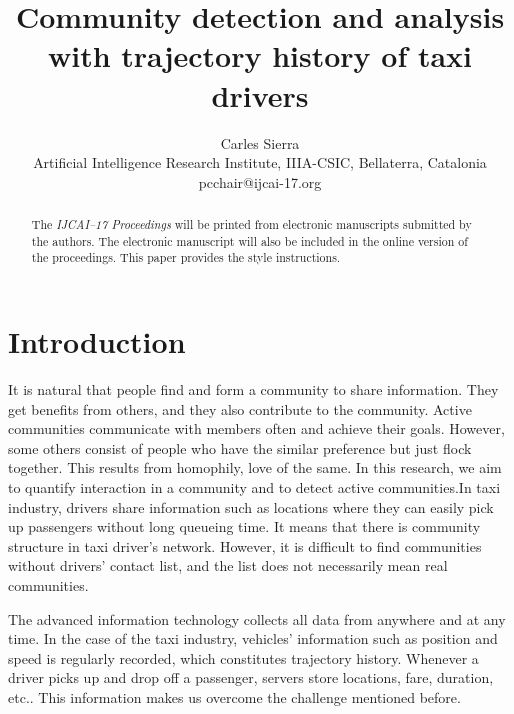 \documentclass{article}
\title{Community detection and analysis with trajectory history of taxi drivers}
\author{Carles Sierra\\ 
Artificial Intelligence Research Institute, IIIA-CSIC, Bellaterra, Catalonia  \\
pcchair@ijcai-17.org}
\begin{document}
\maketitle

\begin{abstract}
  The {\it IJCAI--17 Proceedings} will be printed from electronic
  manuscripts submitted by the authors. The electronic manuscript will
  also be included in the online version of the proceedings. This paper
  provides the style instructions.
\end{abstract}

\section{Introduction} \label{sec:introduction}

It is natural that people find and form a community to share information. They get benefits from others, and they also contribute to the community. Active communities communicate with members often and achieve their goals. However, some others consist of people who have the similar preference but just flock together. This results from homophily, love of the same. In this research, we aim to quantify interaction in a community and to detect active communities.In taxi industry, drivers share information such as locations where they can easily pick up passengers without long queueing time. It means that there is community structure in taxi driver's network. However, it is difficult to find communities without drivers' contact list, and the list does not necessarily mean real communities.

The advanced information technology collects all data from anywhere and at any time. In the case of the taxi industry, vehicles' information such as position and speed is regularly recorded, which constitutes trajectory history. Whenever a driver picks up and drop off a passenger, servers store locations, fare, duration, etc.. This information makes us overcome the challenge mentioned before.
\end{document}
